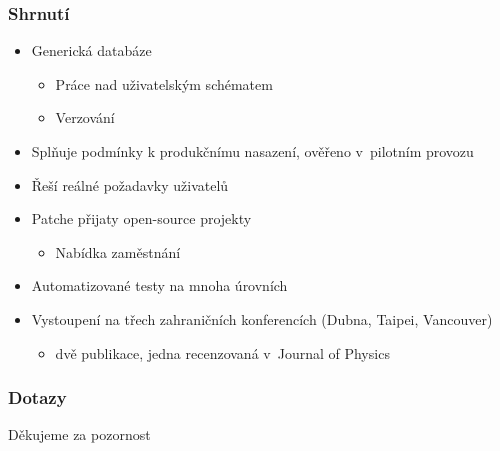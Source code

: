 \documentclass{beamer}
\begin{document}
\begin{frame}[fragile]
\frametitle{Shrnutí}
\begin{itemize}
    \item Generická databáze
        \begin{itemize}
            \item Práce nad uživatelským schématem
            \item Verzování
        \end{itemize}
    \item Splňuje podmínky k produkčnímu nasazení, ověřeno v~pilotním provozu
    \item Řeší reálné požadavky uživatelů
    \item Patche přijaty open-source projekty
        \begin{itemize}
            \item Nabídka zaměstnání
        \end{itemize}
    \item Automatizované testy na mnoha úrovních
    \item Vystoupení na třech zahraničních konferencích (Dubna, Taipei, Vancouver)
        \begin{itemize}
            \item dvě publikace, jedna recenzovaná v~Journal of Physics
        \end{itemize}
\end{itemize}
\end{frame}


\begin{frame}[fragile]
\frametitle{Dotazy}
\begin{center}
    Děkujeme za pozornost
\end{center}
\end{frame}
\end{document}
